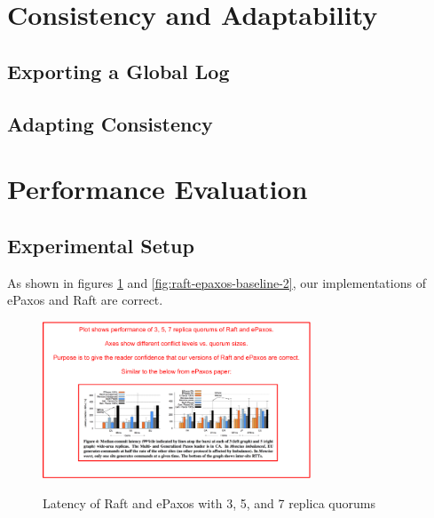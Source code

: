 \documentclass[sigplan,screen,review,anonymous,nonacm]{acmart}
\begin{document}
\section{Consistency and Adaptability}

\subsection{Exporting a Global Log}

\subsection{Adapting Consistency}

\section{Performance Evaluation}

\subsection{Experimental Setup}


As shown in figures \ref{fig:raft-epaxos-baseline-1} and
\ref{fig:raft-epaxos-baseline-2}, our implementations of ePaxos and 
Raft are correct.

\begin{figure}
\caption{Latency of Raft and ePaxos with 3, 5, and 7 replica quorums}
\centering
\includegraphics[width=8cm]{raft-epaxos-baseline-1-placeholder.png}
\label{fig:raft-epaxos-baseline-1}
\end{figure}
\end{document}
